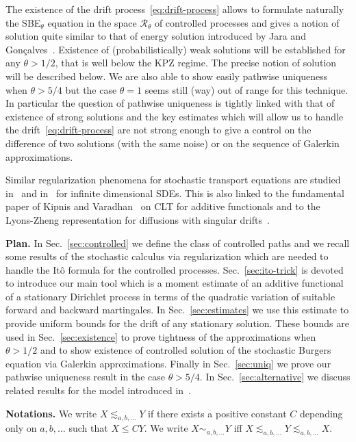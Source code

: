 \documentclass[11pt,a4paper,reqno]{amsart}
\begin{document}
The existence of the drift process~\eqref{eq:drift-process} allows to formulate naturally the SBE$_\theta$ equation in the space $\mathcal{R}_\theta$ of controlled processes and gives a notion of solution quite similar to that of energy solution introduced by Jara and Gon\c{c}alves~\cite{JG}. Existence of (probabilistically) weak solutions will be established for any  $\theta > 1/2$, that is well below the KPZ regime. The precise notion of solution will be described below. We are also able to show easily pathwise uniqueness when $\theta > 5/4$ but the  case $\theta=1$ seems still (way) out of range for this technique. In particular the question of pathwise uniqueness is tightly linked with that of existence of strong solutions and the key estimates which will allow us to handle the drift~\eqref{eq:drift-process} are not strong enough to give a control on the difference of two solutions (with the same noise) or on the sequence of Galerkin approximations.

Similar regularization phenomena for stochastic transport equations are studied in~\cite{FGP} and in~\cite{DF} for infinite dimensional SDEs. This is also linked to the fundamental paper of Kipnis and Varadhan~\cite{KV} on CLT for additive functionals and to the Lyons-Zheng representation for diffusions with singular drifts~\cites{MR1988703, MR2065168}.

\bigskip
\textbf{Plan.} In
Sec.~\ref{sec:controlled} we define the class of controlled paths and we recall some results of the stochastic calculus via regularization which are needed to handle the It\^o formula for the controlled processes.
Sec.~\ref{sec:ito-trick} is devoted to introduce our main tool which is a moment estimate of an additive functional of a stationary Dirichlet process in terms of the quadratic variation of suitable forward and backward martingales. In Sec.~\ref{sec:estimates} we use this estimate to provide uniform bounds for the drift of any stationary solution. These bounds are  used in Sec.~\ref{sec:existence} to prove tightness of the approximations when $\theta > 1/2$ and to show existence of controlled solution of the stochastic Burgers equation via Galerkin approximations. Finally in Sec.~\ref{sec:uniq} we prove our pathwise uniqueness result in the case $\theta > 5/4$. In Sec.~\ref{sec:alternative} we discuss related results for the model introduced in~\cite{DDT}.


\bigskip
\textbf{Notations.} We write $X \lesssim_{a,b,\dots} Y$ if there exists a positive constant $C$ depending only on $a,b,\dots$ such that $X \le C Y$. We write $X \sim_{a,b,\dots} Y$ iff $X\lesssim_{a,b,\dots} Y \lesssim_{a,b,\dots} X$. 
\end{document}
